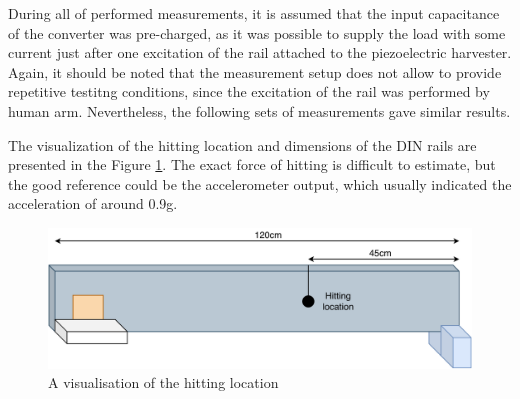 \documentclass[12pt,a4paper]{article}
\begin{document}
During all of performed measurements, it is assumed that the input capacitance of the converter was pre-charged, as it was possible to supply the load with some current just after one excitation of the rail attached to the piezoelectric harvester. Again, it should be noted that the measurement setup does not allow to provide repetitive testitng conditions, since the excitation of the rail was performed by human arm. Nevertheless, the following sets of measurements gave similar results.
\par
The visualization of the hitting location and dimensions of the DIN rails are presented in the Figure \ref{fig:dinrail}. The exact force of hitting is difficult to estimate, but the good reference could be the accelerometer output, which usually indicated the acceleration of around 0.9g.

\begin{figure}[ht!]
\includegraphics[scale=0.75]{dinrail.pdf}
\caption{A visualisation of the hitting location}
\label{fig:dinrail}
\end{figure}
\end{document}
